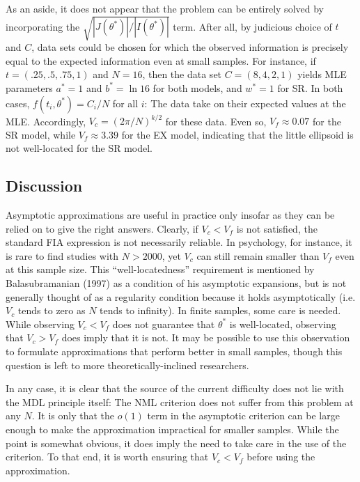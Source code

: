 \documentclass[doc,floatsintext]{apa6}
\begin{document}
As an aside, it does not appear that the problem can be entirely solved by incorporating the $\sqrt{|J(\theta^\ast)|/|I(\theta^\ast)|}$ term. After all, by judicious choice of $t$ and $C$, data sets could be chosen for which the observed information is precisely equal to the expected information even at small samples. For instance, if $t=(.25, .5, .75, 1)$ and $N=16$, then the data set $C=(8, 4, 2, 1)$ yields MLE parameters $a^*=1$ and $b^*=\ln 16$ for both models, and $w^*=1$ for SR. In both cases, $f(t_i, \theta^*)=C_i/N$ for all $i$: The data take on their expected values at the MLE. Accordingly, $V_c = \left(2\pi/N\right)^{k/2}$ for these data. Even so, $V_f \approx 0.07$ for the SR model, while $V_f \approx 3.39$ for the EX model, indicating that the little ellipsoid is not well-located for the SR model.

\subsection*{Discussion}

Asymptotic approximations are useful in practice only insofar as they can be relied on to give the right answers. Clearly, if $V_c < V_f$ is not satisfied, the standard FIA expression is not necessarily reliable. In psychology, for instance, it is rare to find studies with $N>2000$, yet $V_c$ can still remain smaller than $V_f$ even at this sample size. This ``well-locatedness'' requirement is mentioned by Balasubramanian (1997) as a condition of his asymptotic expansions, but is not generally thought of as a regularity condition because it holds asymptotically (i.e. $V_c$ tends to zero as $N$ tends to infinity). In finite samples, some care is needed. While observing $V_c < V_f$ does not guarantee that $\theta^*$ is well-located, observing that $V_c > V_f$ does imply that it is not. It may be possible to use this observation to formulate approximations that perform better in small samples, though this question is left to more theoretically-inclined researchers.

In any case, it is clear that the source of the current difficulty does not lie with the MDL principle itself: The NML criterion does not suffer from this problem at any $N$. It is only that the $o(1)$ term in the asymptotic criterion can be large enough to make the approximation impractical for smaller samples. While the point is somewhat obvious, it does imply the need to take care in the use of the criterion. To that end, it is worth ensuring that $V_c < V_f$ before using the approximation.
\end{document}
